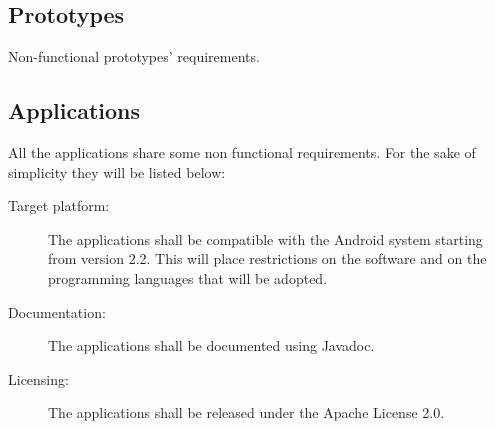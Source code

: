 \subsection{Prototypes}

Non-functional prototypes' requirements.


\newpage

\subsection{Applications}

All the applications share some non functional requirements.
For the sake of simplicity they will be listed below:

\begin{description}
	\item[Target platform:] The applications shall be compatible with the Android
	system starting from version 2.2. This will place restrictions on the software
	and on the programming languages that will be adopted.
	\item[Documentation:] The applications shall be documented using Javadoc.
	\item[Licensing:] The applications shall be released under the Apache License 2.0.
\end{description}

\newpage
